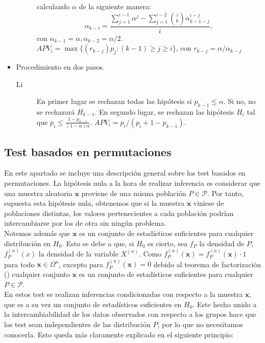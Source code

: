 \begin{itemize}
\begin{description}
		calculando $\alpha$ de la siguiente manera:
		\[ 
			\alpha_{k-i} = \frac{
								\sum\limits_{j=1}^{i-1}
									\alpha^j
								- \sum\limits_{j=1}^{i-2}
									{i \choose k}
									\alpha_{k-1-j}^{i-j}
						}{i},
		\]
		con $\alpha_{k-1} = \alpha, \alpha_{k-2}= \alpha/2$. 
		$APV_i = \max \{(r_{k-j})p_j: (k-1) \geq j \geq 
		i \}$, con $r_{k-j}=\alpha/\alpha_{k-j}$
	\end{description}	
\item Procedimiento en dos pasos.
	\begin{description}
	\item[Li] En primer lugar se rechazan todas las 
		hipótesis si $p_{k-1} \leq \alpha$. Si no, 
		no se rechazará $H_{k-1}$. En segundo lugar, se 
		rechazan las hipótesis $H_{i}$ tal que 
		$p_i \leq \frac{1-p_{k-1}}{(1-\alpha)\alpha}$.
		$APV_i = p_i/(p_i + 1 - p_{k-1})$.	
	\end{description}	 
\end{itemize}

\subsection{Test basados en permutaciones}
	
	En este apartado se incluye una descripción general sobre 
los test basados en permutaciones. La hipótesis nula a la 
hora de realizar inferencia es considerar que una muestra 
aleatoria $\mathbf{x}$ proviene de una misma población 
$P \in \mathcal{P}$. Por tanto, supuesta esta hipótesis nula, 
obtenemos que si la muestra $\mathbf{x}$ viniese de 
poblaciones distintas, los valores pertenecientes a cada 
población podrían intercambiarse por los de otra sin ningún 
problema.\\
	Notemos además que $\mathbf{x}$ es un conjunto de 
estadísticos suficientes para cualquier distribución en 
$H_0$. Esto se debe a que, si $H_0$ es cierto, sea $f_P$ la 
densidad de $P$, $f_P^{(n)}(x)$ la densidad de la variable 
$X^{(n)}$. Como $f_P^{(n)}(\mathbf{x}) = f_P^{(n)}(\mathbf{x}) 
\cdot 1$ para todo $\mathbf{x} \in \Omega^n$, excepto para 
$f_P^{(n)}(\mathbf{x}) = 0$ debido al teorema de 
factorización (\cite{VELEZGARCIA93}) cualquier conjunto $\mathbf{x}$ 
es un conjunto 
de estadísticos suficientes para cualquier $P \in 
\mathcal{P}$.\\
	En estos test se realizan inferencias condicionadas con
respecto a la muestra $\mathbf{x}$, que es a su vez un conjunto de 
estadísticos suficientes en $H_0$. Este hecho unido a la 
intercambiabilidad de los datos observados con respecto a los 
grupos hace que los test sean independientes de las 
distribución $P$, por lo que no necesitamos conocerla. Esto 
queda más claramente explicado en el siguiente principio:

